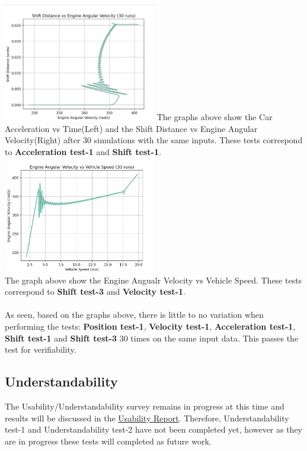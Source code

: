 \documentclass[12pt, titlepage]{article}
\begin{document}
\includegraphics[width=0.5\textwidth]{simulation-figures/shift_distance_vs_engine_velocity_30.png}
\noindent The graphs above show the Car Acceleration vs Time(Left) and the Shift Distance vs Engine Angular Velocity(Right) after 30 simulations with the same inputs.
These tests correspond to \textbf{Acceleration test-1} and \textbf{Shift test-1}. \\
\includegraphics[width=0.5\textwidth]{simulation-figures/shift_curve_30.png}
\\
\noindent The graph above show the Engine Angualr Velocity vs Vehicle Speed. 
These tests correspond to \textbf{Shift test-3} and \textbf{Velocity test-1}. \\
\\
As seen, based on the graphs above, there is little to no variation when performing the tests: \textbf{Position test-1}, \textbf{Velocity test-1}, \textbf{Acceleration test-1}, \textbf{Shift test-1} and \textbf{Shift test-3} 30 times on the same input data.
This passes the test for verifiability. 

\subsection{Understandability}
The Usability/Understandability survey remains in progress at this time and results will be discussed in the \href{file:../UsabilityReport/UsabilityReport.pdf}{Usability Report}. 
Therefore, Understandability test-1 and Understandability test-2 have not been completed yet, however as they are in progress these tests will completed as future work. 
\end{document}
